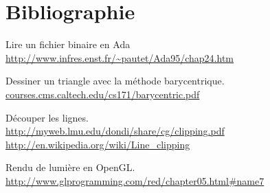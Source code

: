 \documentclass[10pt]{article}
\begin{document}

\section{Bibliographie}

Lire un fichier binaire en Ada \\
\url{http://www.infres.enst.fr/~pautet/Ada95/chap24.htm}

Dessiner un triangle avec la méthode barycentrique. \\
\url{courses.cms.caltech.edu/cs171/barycentric.pdf}

Découper les lignes. \\
\url{http://myweb.lmu.edu/dondi/share/cg/clipping.pdf} \\
\url{http://en.wikipedia.org/wiki/Line_clipping}

Rendu de lumière en OpenGL. \\
\url{http://www.glprogramming.com/red/chapter05.html#name7}
\end{document}
